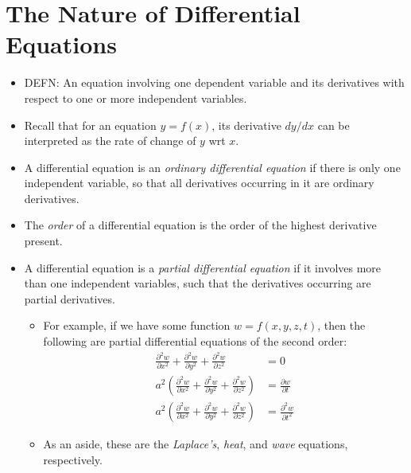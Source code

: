 \documentclass[../jaynes_prob_theory_notes.tex]{subfiles}
\begin{document}
\section{The Nature of Differential Equations}
    \begin{itemize}
        \item \textsc{DEFN}: An equation involving one dependent variable and its derivatives with respect to one or more independent variables.
        \item Recall that for an equation $y=f(x)$, its derivative $dy/dx$ can be interpreted as the rate of change of $y$ wrt $x$.
        \item A differential equation is an \textit{ordinary differential equation} if there is only one independent variable, so that all derivatives occurring in it are ordinary derivatives.
        \item The \textit{order} of a differential equation is the order of the highest derivative present.
        \item A differential equation is a \textit{partial differential equation} if it involves more than one independent variables, such that the derivatives occurring are partial derivatives.
            \begin{itemize}
                \item For example, if we have some function $w = f(x,y,z,t)$, then the following are partial differential equations of the second order:
                    \begin{align*}
                        \frac{{\partial}^2 w}{\partial x^2} + \frac{{\partial}^2 w}{\partial y^2} + \frac{{\partial}^2 w}{\partial z^2} &= 0 \\
                        a^{2} \left( \frac{{\partial}^2 w}{\partial x^2} + \frac{{\partial}^2 w}{\partial y^2} + \frac{{\partial}^2 w}{\partial z^2} \right) &= \frac{\partial w}{\partial t} \\
                        a^{2} \left( \frac{{\partial}^2 w}{\partial x^2} + \frac{{\partial}^2 w}{\partial y^2} + \frac{{\partial}^2 w}{\partial z^2} \right) &= \frac{{\partial}^2 w}{\partial t^2} 
                    \end{align*}
                \item As an aside, these are the \textit{Laplace's}, \textit{heat}, and \textit{wave} equations, respectively.
            \end{itemize}
    \end{itemize}
\end{document}
